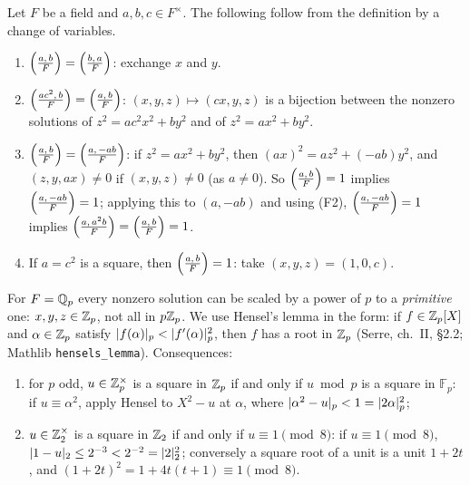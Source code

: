 \begin{remark}\label{rem:qalg-hilbert-tools}
Let $F$ be a field and $a,b,c\in F^\times$. The following follow from the definition by a change of variables.
\begin{enumerate}[label=(F\arabic*)]
\item $\Bigl(\tfrac{a,\,b}{F}\Bigr)=\Bigl(\tfrac{b,\,a}{F}\Bigr)$: exchange $x$ and $y$.
\item $\Bigl(\tfrac{ac^2,\,b}{F}\Bigr)=\Bigl(\tfrac{a,\,b}{F}\Bigr)$: $(x,y,z)\mapsto(cx,y,z)$ is a bijection between the nonzero solutions of $z^2=ac^2x^2+by^2$ and of $z^2=ax^2+by^2$.
\item $\Bigl(\tfrac{a,\,b}{F}\Bigr)=\Bigl(\tfrac{a,\,-ab}{F}\Bigr)$: if $z^2=ax^2+by^2$, then $(ax)^2=az^2+(-ab)y^2$, and $(z,y,ax)\ne0$ if $(x,y,z)\ne0$ (as $a\ne0$). So
  $\Bigl(\tfrac{a,\,b}{F}\Bigr)=1$ implies $\Bigl(\tfrac{a,\,-ab}{F}\Bigr)=1$; applying this to $(a,-ab)$ and using (F2), $\Bigl(\tfrac{a,\,-ab}{F}\Bigr)=1$ implies $\Bigl(\tfrac{a,\,a^2b}{F}\Bigr)=\Bigl(\tfrac{a,\,b}{F}\Bigr)=1$.
\item If $a=c^2$ is a square, then $\Bigl(\tfrac{a,\,b}{F}\Bigr)=1$: take $(x,y,z)=(1,0,c)$.
\end{enumerate}
For $F=\mathbb{Q}_p$ every nonzero solution can be scaled by a power of $p$ to a \emph{primitive} one: $x,y,z\in\mathbb{Z}_p$, not all in $p\mathbb{Z}_p$.
We use Hensel's lemma in the form: if $f\in\mathbb{Z}_p[X]$ and $\alpha\in\mathbb{Z}_p$ satisfy $\lvert f(\alpha)\rvert_p<\lvert f'(\alpha)\rvert_p^2$, then $f$ has a root in $\mathbb{Z}_p$
(Serre, ch.~II, §2.2; Mathlib \texttt{hensels\_lemma}). Consequences:
\begin{enumerate}[label=(H\arabic*)]
\item for $p$ odd, $u\in\mathbb{Z}_p^\times$ is a square in $\mathbb{Z}_p$ if and only if $u\bmod p$ is a square in $\mathbb F_p$: if $u\equiv\alpha^2$, apply Hensel to
  $X^2-u$ at $\alpha$, where $\lvert\alpha^2-u\rvert_p<1=\lvert2\alpha\rvert_p^2$;
\item $u\in\mathbb{Z}_2^\times$ is a square in $\mathbb{Z}_2$ if and only if $u\equiv1\pmod8$: if $u\equiv1\pmod 8$, $\lvert1-u\rvert_2\le2^{-3}<2^{-2}=\lvert2\rvert_2^2$; conversely
  a square root of a unit is a unit $1+2t$, and $(1+2t)^2=1+4t(t+1)\equiv1\pmod8$.
\end{enumerate}
\end{remark}

